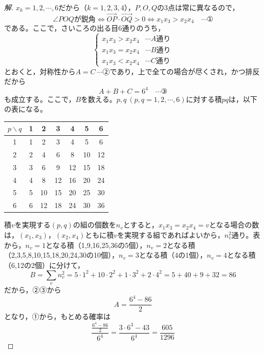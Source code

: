 \documentclass[../main.tex]{subfiles}
\begin{document}
\begin{proof}[解]
  $x_k=1,2,\cdots,6$だから（$k=1,2,3,4$），$P,O,Q$の3点は常に異なるので，
  \[
    \angle POQ\text{が鋭角} \iff \overrightarrow{OP}\cdot\overrightarrow{OQ}>0 \iff x_1x_3>x_2x_4 \quad\cdots\text{①}
  \]
  である。ここで，さいころの出る目6通りのうち，
  \[
    \begin{cases}
      x_1x_3>x_2x_4 & \cdots A\text{通り} \\
      x_1x_3=x_2x_4 & \cdots B\text{通り} \\
      x_1x_3<x_2x_4 & \cdots C\text{通り}
    \end{cases}
  \]
  とおくと，対称性から$A=C\ \cdots$②であり，上で全ての場合が尽くされ，かつ排反だから
  \[
    A+B+C=6^4 \quad\cdots\text{③}
  \]
  も成立する。ここで，$B$を数える。$p,q\ (p,q=1,2,\cdots,6)$に対する積$pq$は，以下の表になる。
  \begin{center}
    \begin{tabular}{c|cccccc}
      $p\backslash q$ & 1 & 2 & 3 & 4 & 5 & 6 \\
      \hline
      1 & 1 & 2 & 3 & 4 & 5 & 6 \\
      2 & 2 & 4 & 6 & 8 & 10 & 12 \\
      3 & 3 & 6 & 9 & 12 & 15 & 18 \\
      4 & 4 & 8 & 12 & 16 & 20 & 24 \\
      5 & 5 & 10 & 15 & 20 & 25 & 30 \\
      6 & 6 & 12 & 18 & 24 & 30 & 36
    \end{tabular}
  \end{center}
  積$v$を実現する$(p,q)$の組の個数を$n_v$とすると，$x_1x_3=x_2x_4=v$となる場合の数は，$(x_1,x_3)$，$(x_2,x_4)$ともに積$v$を実現する組であればよいから，$n_v^2$通り。表から，$n_v=1$となる積（1,9,16,25,36の5個），$n_v=2$となる積（2,3,5,8,10,15,18,20,24,30の10個），$n_v=3$となる積（4の1個），$n_v=4$となる積（6,12の2個）に分けて，
  \[
    B=\sum_vn_v^2=5\cdot1^2+10\cdot2^2+1\cdot3^2+2\cdot4^2=5+40+9+32=86
  \]
  だから，②③から
  \[
    A=\frac{6^4-86}{2}
  \]
  となり，①から，もとめる確率は
  \[
    \frac{\frac{6^4-86}{2}}{6^4}=\frac{3\cdot6^3-43}{6^4}=\frac{605}{1296}
  \]
\end{proof}
\end{document}
